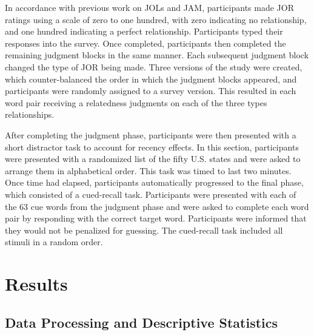 \documentclass[english,,man]{apa6}
\begin{document}
In accordance with previous work on JOLs and JAM, participants made JOR
ratings using a scale of zero to one hundred, with zero indicating no
relationship, and one hundred indicating a perfect relationship.
Participants typed their responses into the survey. Once completed,
participants then completed the remaining judgment blocks in the same
manner. Each subsequent judgment block changed the type of JOR being
made. Three versions of the study were created, which counter-balanced
the order in which the judgment blocks appeared, and participants were
randomly assigned to a survey version. This resulted in each word pair
receiving a relatedness judgments on each of the three types
relationships.

After completing the judgment phase, participants were then presented
with a short distractor task to account for recency effects. In this
section, participants were presented with a randomized list of the fifty
U.S. states and were asked to arrange them in alphabetical order. This
task was timed to last two minutes. Once time had elapsed, participants
automatically progressed to the final phase, which consisted of a
cued-recall task. Participants were presented with each of the 63 cue
words from the judgment phase and were asked to complete each word pair
by responding with the correct target word. Participants were informed
that they would not be penalized for guessing. The cued-recall task
included all stimuli in a random order.

\section{Results}\label{results}

\subsection{Data Processing and Descriptive
Statistics}\label{data-processing-and-descriptive-statistics}
\end{document}
